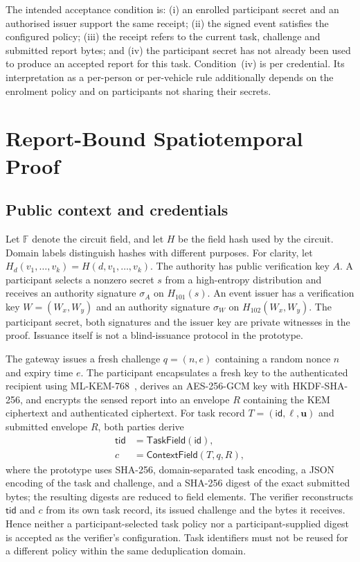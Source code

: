 \documentclass[pdflatex,iicol,sn-mathphys-num]{sn-jnl}
\begin{document}
The intended acceptance condition is: (i) an enrolled participant secret and an authorised issuer support the same receipt; (ii) the signed event satisfies the configured policy; (iii) the receipt refers to the current task, challenge and submitted report bytes; and (iv) the participant secret has not already been used to produce an accepted report for this task. Condition~(iv) is per credential. Its interpretation as a per-person or per-vehicle rule additionally depends on the enrolment policy and on participants not sharing their secrets.

\section{Report-Bound Spatiotemporal Proof}
\label{sec:protocol}

\subsection{Public context and credentials}
\label{sec:context}

Let $\mathbb F$ denote the circuit field, and let $H$ be the field hash used by the circuit. Domain labels distinguish hashes with different purposes. For clarity, let $H_d(v_1,\ldots,v_k)=H(d,v_1,\ldots,v_k)$. The authority has public verification key $A$. A participant selects a nonzero secret $s$ from a high-entropy distribution and receives an authority signature $\sigma_A$ on $H_{101}(s)$. An event issuer has a verification key $W=(W_x,W_y)$ and an authority signature $\sigma_W$ on $H_{102}(W_x,W_y)$. The participant secret, both signatures and the issuer key are private witnesses in the proof. Issuance itself is not a blind-issuance protocol in the prototype.

The gateway issues a fresh challenge $q=(n,e)$ containing a random nonce $n$ and expiry time $e$. The participant encapsulates a fresh key to the authenticated recipient using ML-KEM-768~\citep{NIST2024MLKEM}, derives an AES-256-GCM key with HKDF-SHA-256, and encrypts the sensed report into an envelope $R$ containing the KEM ciphertext and authenticated ciphertext. For task record $T=(\mathsf{id},\boldsymbol{\ell},\boldsymbol u)$ and submitted envelope $R$, both parties derive
\begin{align}
 \mathsf{tid}&=\mathsf{TaskField}(\mathsf{id}),\\
 c&=\mathsf{ContextField}(T,q,R),
\end{align}
where the prototype uses SHA-256, domain-separated task encoding, a JSON encoding of the task and challenge, and a SHA-256 digest of the exact submitted bytes; the resulting digests are reduced to field elements. The verifier reconstructs $\mathsf{tid}$ and $c$ from its own task record, its issued challenge and the bytes it receives. Hence neither a participant-selected task policy nor a participant-supplied digest is accepted as the verifier's configuration. Task identifiers must not be reused for a different policy within the same deduplication domain.
\end{document}
